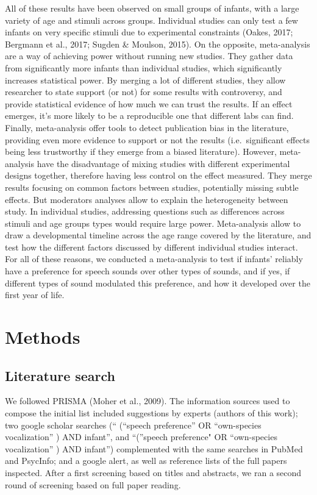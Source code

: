 \documentclass[man]{apa6}
\begin{document}
All of these results have been observed on small groups of infants, with
a large variety of age and stimuli across groups. Individual studies can
only test a few infants on very specific stimuli due to experimental
constraints (Oakes, 2017; Bergmann et al., 2017; Sugden \& Moulson,
2015). On the opposite, meta-analysis are a way of achieving power
without running new studies. They gather data from significantly more
infants than individual studies, which significantly increases
statistical power. By merging a lot of different studies, they allow
researcher to state support (or not) for some results with controversy,
and provide statistical evidence of how much we can trust the results.
If an effect emerges, it's more likely to be a reproducible one that
different labs can find. Finally, meta-analysis offer tools to detect
publication bias in the literature, providing even more evidence to
support or not the results (i.e.~significant effects being less
trustworthy if they emerge from a biased literature). However,
meta-analysis have the disadvantage of mixing studies with different
experimental designs together, therefore having less control on the
effect measured. They merge results focusing on common factors between
studies, potentially missing subtle effects. But moderators analyses
allow to explain the heterogeneity between study. In individual studies,
addressing questions such as differences across stimuli and age groups
types would require large power. Meta-analysis allow to draw a
developmental timeline across the age range covered by the literature,
and test how the different factors discussed by different individual
studies interact. For all of these reasons, we conducted a meta-analysis
to test if infants' reliably have a preference for speech sounds over
other types of sounds, and if yes, if different types of sound modulated
this preference, and how it developed over the first year of life.

\section{Methods}\label{methods}

\subsection{Literature search}\label{literature-search}

We followed PRISMA (Moher et al., 2009). The information sources used to
compose the initial list included suggestions by experts (authors of
this work); two google scholar searches (`` (\enquote{speech preference}
OR \enquote{own-species vocalization} ) AND infant'', and
\enquote{(}speech preference" OR \enquote{own-species vocalization} )
AND infant'') complemented with the same searches in PubMed and
PsycInfo; and a google alert, as well as reference lists of the full
papers inspected. After a first screening based on titles and abstracts,
we ran a second round of screening based on full paper reading.
\end{document}

